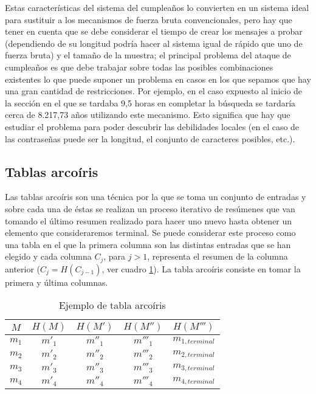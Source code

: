 Estas características del sistema del cumpleaños lo convierten en un sistema ideal para sustituir a los mecanismos de fuerza bruta convencionales, pero hay que tener en cuenta que se debe considerar el tiempo de crear los mensajes a probar (dependiendo de su longitud podría hacer al sistema igual de rápido que uno de fuerza bruta) y el tamaño de la muestra; el principal problema del ataque de cumpleaños es que debe trabajar sobre todas las posibles combinaciones existentes lo que puede suponer un problema en casos en los que sepamos que hay una gran cantidad de restricciones. Por ejemplo, en el caso expuesto al inicio de la sección en el que se tardaba 9,5 horas en completar la búsqueda se tardaría cerca de 8.217,73 años utilizando este mecanismo. Esto significa que hay que estudiar el problema para poder descubrir las debilidades locales (en el caso de las contraseñas puede ser la longitud, el conjunto de caracteres posibles, etc.).

\subsection{Tablas arcoíris}

Las tablas arcoíris son una técnica por la que se toma un conjunto de entradas y sobre cada una de éstas se realizan un proceso iterativo de resúmenes que van tomando el último resumen realizado para hacer uno nuevo hasta obtener un elemento que consideraremos terminal. Se puede considerar este proceso como una tabla en el que la primera columna son las distintas entradas que se han elegido y cada columna $C_j$, para $j>1$, representa el resumen de la columna anterior ($C_j = H(C_{j-1})$, ver cuadro \ref{tab:arcoiris}). La tabla arcoíris consiste en tomar la primera y última columnas.

\begin{table}
	\centering
	\begin{tabular}{ccccc}
		$M$   & $H(M)$ & $H(M')$ & $H(M'')$ & $H(M''')$\\
		\hline
		$m_1$ & $m'_1$ & $m''_1$ & $m'''_1$ & $m_{1,terminal}$\\
		\hline
		$m_2$ & $m'_2$ & $m''_2$ & $m'''_2$ & $m_{2,terminal}$\\
		\hline
		$m_3$ & $m'_3$ & $m''_3$ & $m'''_3$ & $m_{3,terminal}$\\
		\hline
		$m_4$ & $m'_4$ & $m''_4$ & $m'''_4$ & $m_{4,terminal}$\\
		\hline
	\end{tabular}
	\caption{Ejemplo de tabla arcoíris}\label{tab:arcoiris}
\end{table}

